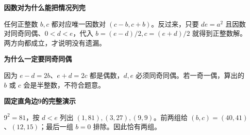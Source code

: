 \clearpage
\begin{explanationbox}
\textbf{\textcolor{CExplanation}{因数对为什么能把情况列完}}
\par\medskip
\begin{center}

\end{center}
\medskip
任何正整数 $b,c$ 都对应唯一因数对 $(c-b,c+b)$。反过来，只要 $de=a^2$ 且因数对同奇同偶、$0<d<e$，代入 $b=(e-d)/2,c=(e+d)/2$ 就得到正整数解。两方向都成立，才说明没有遗漏。
\end{explanationbox}
\clearpage
\begin{explanationbox}
\textbf{\textcolor{CExplanation}{为什么一定要同奇同偶}}
\par\medskip
\begin{center}

\end{center}
\medskip
因为 $e-d=2b$、$e+d=2c$ 都是偶数，$d,e$ 必须同奇同偶。若一奇一偶，算出的 $b$ 或 $c$ 会是半整数，不符合题意。
\end{explanationbox}
\clearpage
\begin{explanationbox}
\textbf{\textcolor{CExplanation}{固定直角边9的完整演示}}
\par\medskip
\begin{center}

\end{center}
\medskip
$9^2=81$，按 $d<e$ 列出 $(1,81),(3,27),(9,9)$。前两组给 $(b,c)=(40,41)$、$(12,15)$；最后一组 $b=0$ 排除。因此恰有两组。
\end{explanationbox}
